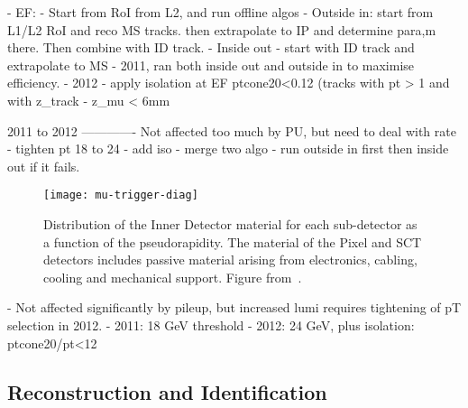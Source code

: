 - EF:
	- Start from RoI from L2, and run offline algos
	- Outside in: start from L1/L2 RoI and reco MS tracks. then extrapolate to IP and determine para,m there. Then combine with ID track.
	- Inside out - start with ID track and extrapolate to MS
	- 2011, ran both inside out and outside in to maximise efficiency.
	- 2012 - apply isolation at EF ptcone20<0.12  (tracks with pt > 1 and with z_track - z_mu < 6mm
	
2011 to 2012
-------------
Not affected too much by PU, but need to deal with rate
- tighten pt 18 to 24
- add iso
- merge two algo - run outside in first then inside out if it fails.





\begin{figure}[h]
\centering
            \texttt{[image: mu-trigger-diag]}
\caption{
Distribution of the Inner Detector material for each sub-detector as a
function of the pseudorapidity. The material of the Pixel and SCT detectors
includes passive material arising from electronics, cabling, cooling and
mechanical support. Figure from~\cite{2012EPJC...72.1849A}.}
\label{fig:mu-trigger-diag}
\end{figure}

- Not affected significantly by pileup, but increased lumi requires tightening of pT selection in 2012.
   - 2011: 18 GeV threshold
   - 2012: 24 GeV, plus isolation: ptcone20/pt<12%
   


\subsection{Reconstruction and Identification}
\label{sec:reco-el-reco}
